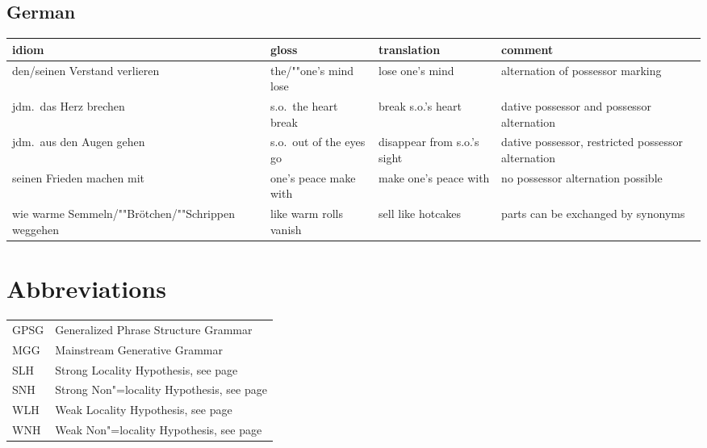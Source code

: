 \documentclass[output=paper
                ,modfonts
                ,nonflat
	        ,collection
	        ,collectionchapter
	        ,collectiontoclongg
 	        ,biblatex
                ,babelshorthands
                ,newtxmath
                ,draftmode
                ,colorlinks, citecolor=brown
]{./langsci/langscibook}
\begin{document}
\subsection*{German}

\begin{sideways}
\begin{tabular}{@{}L{4cm}lL{4.0cm}L{4.0cm}}
idiom & gloss & translation & comment\\\hline
%
 {den/seinen Verstand verlieren}
 & {the/""one's mind lose}
 & {lose one's mind}
 & {alternation of possessor marking}
 \\
 {jdm.\ das Herz brechen} & s.o.\ the heart break & break s.o.'s heart
 & {dative possessor and possessor alternation}\\
 {jdm.\ aus den Augen gehen} & s.o.\ out of the eyes go
 & {disappear from s.o.'s sight} &
 {dative possessor, restricted possessor alternation}\\
 {seinen Frieden machen mit}
 & {one's peace make with}
 & {make one's peace with}
 & {no possessor alternation possible}\\
 {wie warme Semmeln/""Brötchen/""Schrippen weggehen}
 & {like warm rolls vanish} & sell like hotcakes & 
 {parts can be exchanged by synonyms}\\
\end{tabular}
\end{sideways}

\section*{Abbreviations}

\begin{tabular}{@{}ll}
GPSG & Generalized Phrase Structure Grammar \citep{GKPS85a}\\
MGG & Mainstream Generative Grammar\\
SLH & Strong Locality Hypothesis, see page \pageref{slh}\\
SNH & Strong Non"=locality Hypothesis, see page \pageref{snh}\\
WLH & Weak Locality Hypothesis, see page \pageref{wlh}\\
WNH & Weak Non"=locality Hypothesis, see page \pageref{wnh}\\
\end{tabular}
\end{document}
